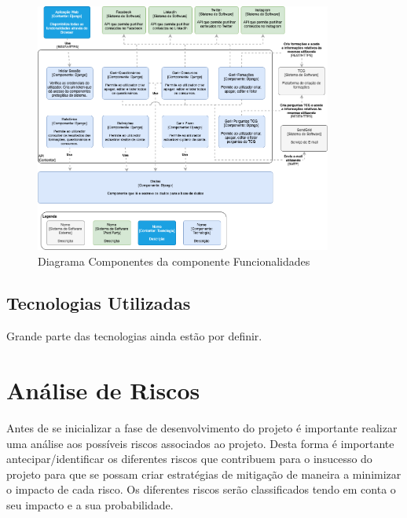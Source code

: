 \begin{figure}[ht!]
	\begin{center}
		\includegraphics[width=0.87\textwidth]{img/arq/diagrama-componentes1}
		\caption{Diagrama Componentes da componente Funcionalidades}
		\label{fig:arq-componentes1}
	\end{center}
\end{figure}

\newpage





\subsection{Tecnologias Utilizadas}

Grande parte das tecnologias ainda estão por definir. 

\section{Análise de Riscos}
\label{analiseriscos}

Antes de se inicializar a fase de desenvolvimento do projeto é importante realizar uma análise aos possíveis riscos associados ao projeto. Desta forma é importante antecipar/identificar os diferentes riscos que contribuem para o insucesso do projeto para que se possam criar estratégias de mitigação de maneira a minimizar o impacto de cada risco. Os diferentes riscos serão classificados tendo em conta o seu impacto e a sua probabilidade.

